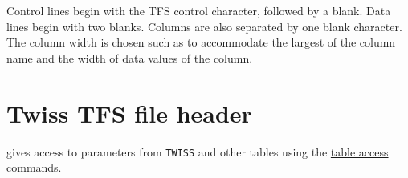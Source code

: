 Control lines begin with the TFS control character, followed by a
blank. Data lines begin with two blanks. Columns are also separated by
one blank character. The column width is chosen such as to accommodate
the largest of the column name and the width of data values of the column.  



\section{Twiss TFS file header}
\label{sec:tfs_twiss}
 

\madx gives access to parameters from \texttt{TWISS} and other tables using the
\hyperref[chap:tables]{table access} commands.  



